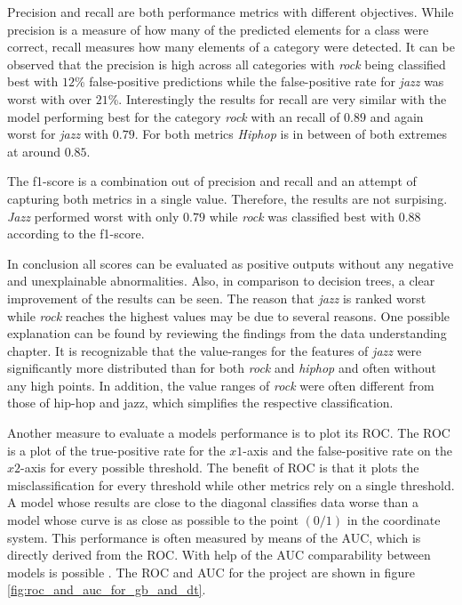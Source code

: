 Precision and recall are both performance metrics with different objectives. While precision is a measure of how many of the 
predicted elements for a class were correct, recall measures how many elements of a category were detected. It can be observed that 
the precision is high across all categories with \emph{rock} being classified best with \(12\)\% false-positive predictions while 
the false-positive rate for \emph{jazz} was worst with over \(21\)\%. Interestingly the results for recall are very similar with the model 
performing best for the category \emph{rock} with an recall of \(0.89\) and again worst for \emph{jazz} with \(0.79\). For both metrics \emph{Hiphop} is in
between of both extremes at around \(0.85\). 

The f1-score is a combination out of precision and recall and an attempt of capturing both metrics in a single value. Therefore,
the results are not surpising. \emph{Jazz} performed worst with only \(0.79\) while \emph{rock} was classified best with \(0.88\) according to the 
f1-score. 

In conclusion all scores can be evaluated as positive outputs without any negative and unexplainable abnormalities. Also, in comparison 
to decision trees, a clear improvement of the results can be seen. The reason that \emph{jazz} is ranked worst while \emph{rock} reaches the 
highest values may be due to several reasons. One possible explanation can be found by reviewing the findings from the data 
understanding chapter. It is recognizable that the value-ranges for the features of \emph{jazz} were significantly more distributed 
than for both \emph{rock} and \emph{hiphop} and often without any high points. In addition, the value ranges of \emph{rock} were often different from 
those of hip-hop and jazz, which simplifies the respective classification. 

Another measure to evaluate a models performance is to plot its \ac{ROC}. The \ac{ROC} is a plot of the true-positive
rate for the \(x1\)-axis and the false-positive rate on the \(x2\)-axis for every possible threshold. The benefit of \ac{ROC} is that it plots the 
misclassification for every threshold while other metrics rely on a single threshold. A model whose results are close to the diagonal classifies data worse than a 
model whose curve is as close as possible to the point \((0/1)\) in the coordinate system. This performance is often measured by means of 
the \ac{AUC}, which is directly derived from the \ac{ROC}. With help of the \ac{AUC} comparability between models is possible \cite[p.862f]{fawcett2006introduction} \cite{scikit-roc_and_auc}. 
The \ac{ROC} and \ac{AUC} for the project are shown in figure \ref{fig:roc_and_auc_for_gb_and_dt}. 

